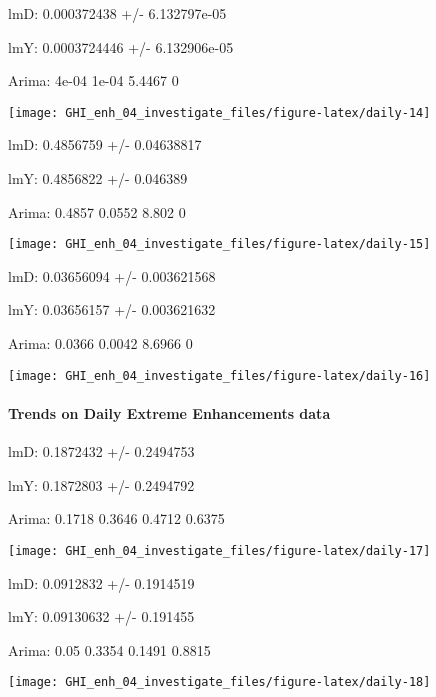 \documentclass[
  10pt,
  a4paper,oneside]{article}
\begin{document}
lmD: 0.000372438 +/- 6.132797e-05

lmY: 0.0003724446 +/- 6.132906e-05

Arima: 4e-04 1e-04 5.4467 0

\begin{center}\texttt{[image: GHI\_enh\_04\_investigate\_files/figure-latex/daily-14]} \end{center}

lmD: 0.4856759 +/- 0.04638817

lmY: 0.4856822 +/- 0.046389

Arima: 0.4857 0.0552 8.802 0

\begin{center}\texttt{[image: GHI\_enh\_04\_investigate\_files/figure-latex/daily-15]} \end{center}

lmD: 0.03656094 +/- 0.003621568

lmY: 0.03656157 +/- 0.003621632

Arima: 0.0366 0.0042 8.6966 0

\begin{center}\texttt{[image: GHI\_enh\_04\_investigate\_files/figure-latex/daily-16]} \end{center}

\newpage

\hypertarget{trends-on-daily-extreme-enhancements-data}{%
\paragraph{Trends on Daily Extreme Enhancements data}\label{trends-on-daily-extreme-enhancements-data}}

lmD: 0.1872432 +/- 0.2494753

lmY: 0.1872803 +/- 0.2494792

Arima: 0.1718 0.3646 0.4712 0.6375

\begin{center}\texttt{[image: GHI\_enh\_04\_investigate\_files/figure-latex/daily-17]} \end{center}

lmD: 0.0912832 +/- 0.1914519

lmY: 0.09130632 +/- 0.191455

Arima: 0.05 0.3354 0.1491 0.8815

\begin{center}\texttt{[image: GHI\_enh\_04\_investigate\_files/figure-latex/daily-18]} \end{center}
\end{document}
